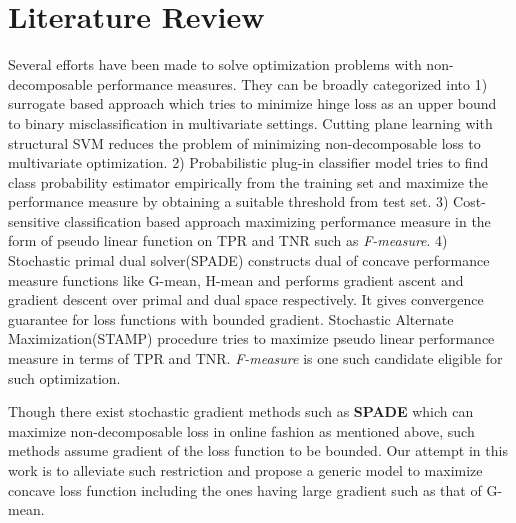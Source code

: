 \documentclass{article} %
\begin{document}
\section{Literature Review}
Several efforts have been made to solve optimization problems with non-decomposable performance measures. They can be broadly categorized into 1) surrogate based approach which tries to minimize hinge loss as an upper bound to binary misclassification in multivariate settings. Cutting plane learning with structural SVM \cite{c1} reduces the problem of minimizing non-decomposable loss to multivariate optimization. 2) Probabilistic plug-in classifier\cite{c3} model tries to find class probability estimator empirically from the training set and maximize the performance measure by obtaining a suitable threshold from test set. 3) Cost-sensitive classification based approach\cite{c6} maximizing performance measure in the form of pseudo linear function on TPR and TNR such as \textit{F-measure}. 4) Stochastic primal dual solver(SPADE)\cite{c2} constructs dual of concave performance measure functions like G-mean, H-mean and performs gradient ascent and gradient descent over primal and dual space respectively. It gives convergence guarantee for loss functions with bounded gradient. Stochastic Alternate Maximization(STAMP)\cite{c2} procedure tries to maximize pseudo linear performance measure in terms of TPR and TNR. \textit{F-measure} is one such candidate eligible for such optimization.

Though there exist stochastic gradient methods such as \textbf{SPADE} which can maximize non-decomposable loss in online fashion\cite{c2} as mentioned above, such methods assume gradient of the loss function to be bounded. Our attempt in this work is to alleviate such restriction and propose a generic model to maximize concave loss function including the ones having large gradient such as that of G-mean.
\end{document}
